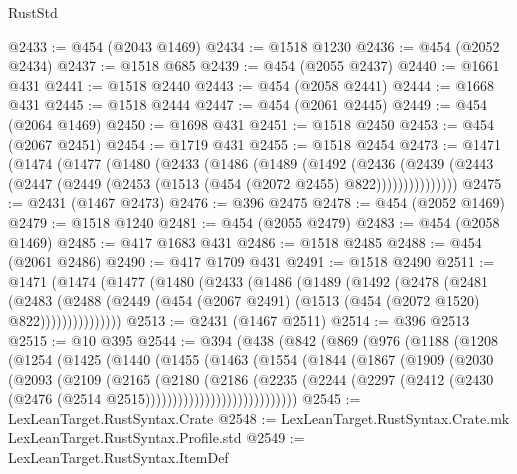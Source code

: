 \begin{lexlean}{RustStd}
\begin{coremodule}
@2433 := @454 (@2043 @1469)
@2434 := @1518 @1230
@2436 := @454 (@2052 @2434)
@2437 := @1518 @685
@2439 := @454 (@2055 @2437)
@2440 := @1661 @431
@2441 := @1518 @2440
@2443 := @454 (@2058 @2441)
@2444 := @1668 @431
@2445 := @1518 @2444
@2447 := @454 (@2061 @2445)
@2449 := @454 (@2064 @1469)
@2450 := @1698 @431
@2451 := @1518 @2450
@2453 := @454 (@2067 @2451)
@2454 := @1719 @431
@2455 := @1518 @2454
@2473 := @1471
    (@1474
      (@1477
        (@1480
          (@2433
            (@1486
              (@1489
                (@1492
                  (@2436
                    (@2439
                      (@2443 (@2447 (@2449 (@2453 (@1513 (@454 (@2072 @2455) @822)))))))))))))))
@2475 := @2431 (@1467 @2473)
@2476 := @396 @2475
@2478 := @454 (@2052 @1469)
@2479 := @1518 @1240
@2481 := @454 (@2055 @2479)
@2483 := @454 (@2058 @1469)
@2485 := @417 @1683 @431
@2486 := @1518 @2485
@2488 := @454 (@2061 @2486)
@2490 := @417 @1709 @431
@2491 := @1518 @2490
@2511 := @1471
    (@1474
      (@1477
        (@1480
          (@2433
            (@1486
              (@1489
                (@1492
                  (@2478
                    (@2481
                      (@2483
                        (@2488
                          (@2449 (@454 (@2067 @2491) (@1513 (@454 (@2072 @1520) @822)))))))))))))))
@2513 := @2431 (@1467 @2511)
@2514 := @396 @2513
@2515 := @10 @395
@2544 := @394
    (@438
      (@842
        (@869
          (@976
            (@1188
              (@1208
                (@1254
                  (@1425
                    (@1440
                      (@1455
                        (@1463
                          (@1554
                            (@1844
                              (@1867
                                (@1909
                                  (@2030
                                    (@2093
                                      (@2109
                                        (@2165
                                          (@2180
                                            (@2186
                                              (@2235
                                                (@2244
                                                  (@2297
                                                    (@2412
                                                      (@2430
                                                        (@2476
                                                          (@2514 @2515))))))))))))))))))))))))))))
@2545 := LexLeanTarget.RustSyntax.Crate
@2548 := LexLeanTarget.RustSyntax.Crate.mk LexLeanTarget.RustSyntax.Profile.std
@2549 := LexLeanTarget.RustSyntax.ItemDef

\end{coremodule}
\end{lexlean}
